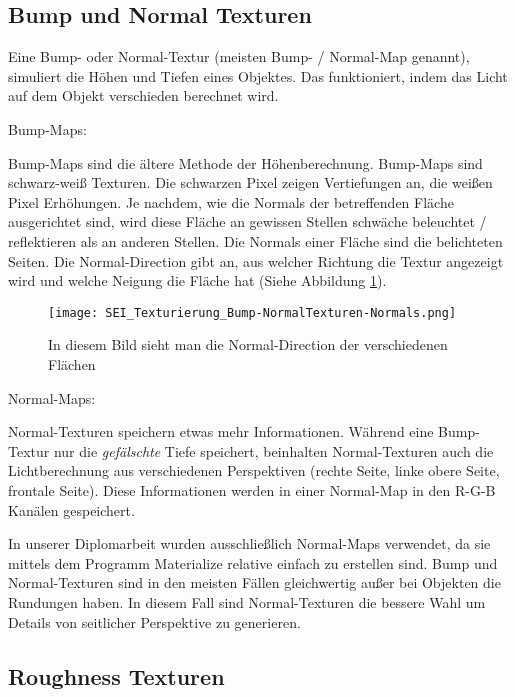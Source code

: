 \subsection{Bump und Normal Texturen}
\label{sec:tex_normal}

Eine Bump- oder Normal-Textur (meisten Bump- / Normal-Map genannt), simuliert die Höhen und Tiefen eines Objektes.
Das funktioniert, indem das Licht auf dem Objekt verschieden berechnet wird.\citep{unity:normal_vs_bump}


Bump-Maps:

Bump-Maps sind die ältere Methode der Höhenberechnung. Bump-Maps sind schwarz-weiß Texturen. Die schwarzen Pixel
zeigen Vertiefungen an, die weißen Pixel Erhöhungen. Je nachdem, wie die Normals der betreffenden Fläche ausgerichtet
sind, wird diese Fläche an gewissen Stellen schwäche beleuchtet / reflektieren als an anderen Stellen. Die Normals
einer Fläche sind die belichteten Seiten. Die Normal-Direction gibt an, aus welcher Richtung die Textur angezeigt
wird und welche Neigung die Fläche hat (Siehe Abbildung \ref{picture:normals}).

\begin{figure}[h]
    \centering
    \texttt{[image: SEI\_Texturierung\_Bump-NormalTexturen-Normals.png]}
    \caption{In diesem Bild sieht man die Normal-Direction der verschiedenen Flächen}
    \label{picture:normals}
\end{figure}


Normal-Maps:

Normal-Texturen speichern etwas mehr Informationen. Während eine Bump-Textur nur die \textit{gefälschte} Tiefe
speichert, beinhalten Normal-Texturen auch die Lichtberechnung aus verschiedenen Perspektiven (rechte Seite,
linke obere Seite, frontale Seite). Diese Informationen werden in einer Normal-Map in den R-G-B Kanälen gespeichert.

In unserer Diplomarbeit wurden ausschließlich Normal-Maps verwendet, da sie mittels dem Programm
Materialize\citep{bbs:materialize} relative einfach zu erstellen sind. Bump und Normal-Texturen sind in den meisten
Fällen gleichwertig außer bei Objekten die Rundungen haben. In diesem Fall sind Normal-Texturen die bessere Wahl
um Details von seitlicher Perspektive zu generieren.

\subsection{Roughness Texturen}
\label{sec:tex_roughness}


